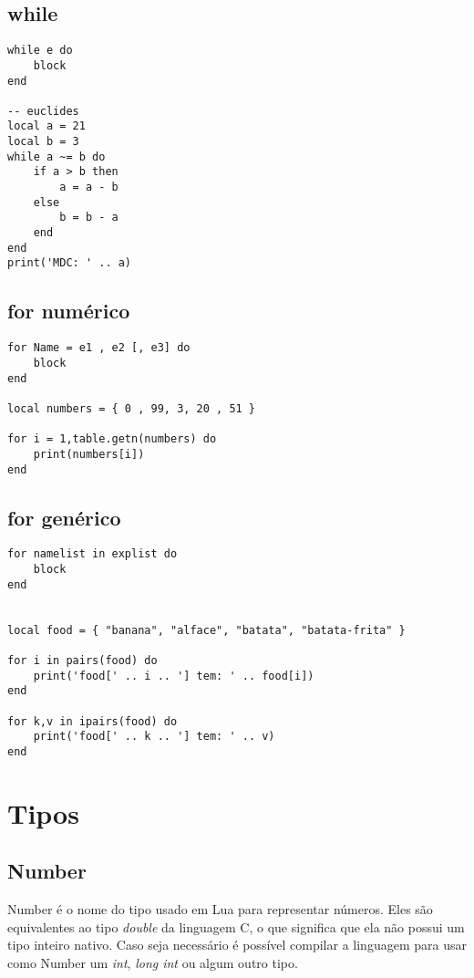 \documentclass[a4paper,12pt]{abnt}
\begin{document}
\section{while}

\begin{lstlisting}
while e do
	block
end

-- euclides
local a = 21
local b = 3
while a ~= b do
	if a > b then
		a = a - b
	else
		b = b - a
	end
end
print('MDC: ' .. a)
\end{lstlisting}

\section{for numérico}

\begin{lstlisting}
for Name = e1 , e2 [, e3] do
	block
end

local numbers = { 0 , 99, 3, 20 , 51 }

for i = 1,table.getn(numbers) do
	print(numbers[i])
end
\end{lstlisting}

\section{for genérico}

\begin{lstlisting}
for namelist in explist do
	block
end


local food = { "banana", "alface", "batata", "batata-frita" }

for i in pairs(food) do
	print('food[' .. i .. '] tem: ' .. food[i])
end

for k,v in ipairs(food) do
	print('food[' .. k .. '] tem: ' .. v)
end
\end{lstlisting}

\chapter{Tipos}

\section{Number}

Number é o nome do tipo usado em Lua para representar números. Eles
são equivalentes ao tipo \emph{double} da linguagem C, o que
significa que ela não possui um tipo inteiro nativo.
Caso seja necessário é possível compilar a linguagem para usar
como Number um \emph{int}, \emph{long int} ou algum outro tipo.
\end{document}
